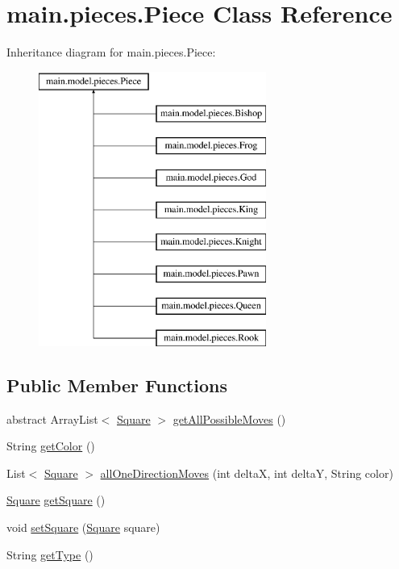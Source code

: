 \hypertarget{classmain_1_1pieces_1_1_piece}{}\section{main.\+pieces.\+Piece Class Reference}
\label{classmain_1_1pieces_1_1_piece}
Inheritance diagram for main.\+pieces.\+Piece\+:\begin{figure}[H]
\begin{center}
\leavevmode
\includegraphics[height=9.000000cm]{classmain_1_1pieces_1_1_piece}
\end{center}
\end{figure}
\subsection*{Public Member Functions}
\begin{DoxyCompactItemize}
\item 
abstract Array\+List$<$ \hyperlink{classmain_1_1_square}{Square} $>$ \hyperlink{classmain_1_1pieces_1_1_piece_a227ebaf4d456aa773b0ba90754572728}{get\+All\+Possible\+Moves} ()
\item 
String \hyperlink{classmain_1_1pieces_1_1_piece_a52545d99f7a6c36b99cfcf40fd0a9cef}{get\+Color} ()
\item 
List$<$ \hyperlink{classmain_1_1_square}{Square} $>$ \hyperlink{classmain_1_1pieces_1_1_piece_a658f7f763d86a73dda37d4e1ecf6a451}{all\+One\+Direction\+Moves} (int deltaX, int deltaY, String color)
\item 
\hyperlink{classmain_1_1_square}{Square} \hyperlink{classmain_1_1pieces_1_1_piece_a562c0141b77a4d7bb0d8b0411cb48303}{get\+Square} ()
\item 
void \hyperlink{classmain_1_1pieces_1_1_piece_a8f19216cafccc3889f9143ad13a4c7be}{set\+Square} (\hyperlink{classmain_1_1_square}{Square} square)
\item 
String \hyperlink{classmain_1_1pieces_1_1_piece_a291b8f58d884f6dec30e101d0bbc59bd}{get\+Type} ()
\end{DoxyCompactItemize}
